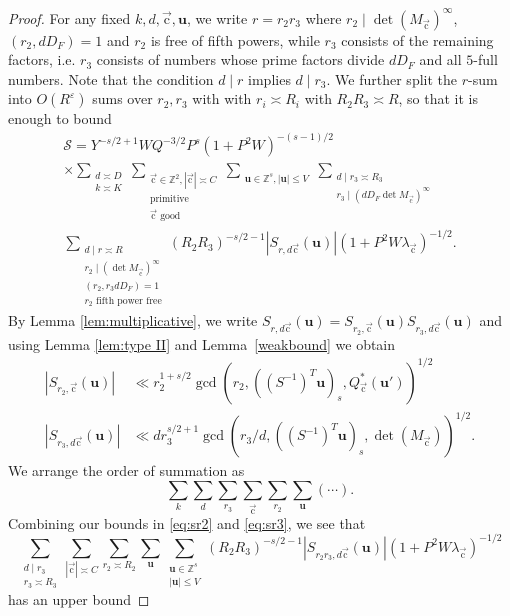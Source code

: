 \documentclass[letterpaper,11pt]{amsart}
\numberwithin{equation}{section}
\theoremstyle{definition}
\numberwithin{equation}{section}
\newcommand{\Z}{\mathbb{Z}}
\newcommand{\ZZ}{\mathbb{Z}}
\newcommand{\uu}{\mathbf{u}}
\newcommand{\uc}{{\vec{\mathrm{c}}}}
\newcommand{\ve}{\varepsilon}
\begin{document}
\begin{proof}
For any fixed $k, d, \uc, \uu$, we write $r=r_2r_3$ where $r_2\mid \det(M_{\uc})^\infty$, $(r_2, dD_F)=1$ and $r_2$ is free of fifth powers, while $r_3$ consists of the remaining factors, i.e. $r_3$ consists of numbers whose prime factors divide $dD_F$ and all $5$-full numbers. Note that the condition $d\mid r$ implies $d\mid r_3$.
We further split the $r$-sum into $O(R^\ve)$ sums over $r_2,r_3$ with with $r_i\asymp R_i$ with $R_2R_3\asymp R$, so that it is enough to bound
\begin{multline*}%
\mathcal S=Y^{-s/2+1}WQ^{-3/2}P^{s}(1+P^2W)^{-(s-1)/2}\\
\times\sum_{\substack{d\asymp D\\ k\asymp K}}\sum_{\substack{\uc\in \ZZ^2, |\uc|\asymp C\\ \text{primitive}\\ \uc \text{ good} }}\sum_{\substack{\uu\in \ZZ^s, |\uu|\leq V}}\sum_{\substack{d\mid r_3\asymp R_3\\ r_3\mid (dD_F\det M_\uc)^\infty}}\\ \sum_{\substack{d\mid r\asymp R\\  r_2\mid (\det M_\uc)^\infty\\ (r_2, r_3dD_F)=1\\ r_2 \text{ fifth power free}}}(R_2R_3)^{-s/2-1}|S_{r, d\uc}(\uu)| (1+P^2W\lambda_\uc)^{-1/2}.
\end{multline*}
By Lemma \ref{lem:multiplicative}, we write
$S_{r,d\uc}(\uu)=S_{r_2,\uc}(\uu)S_{r_3,d\uc}(\uu)$ and using 
Lemma \ref{lem:type II} and Lemma~\ref{weakbound} we obtain
\begin{align}
|S_{r_2,\uc}(\uu)|&\ll r_2^{1+s/2}\gcd(r_2,((S^{-1})^T\uu)_s,Q^*_\uc(\uu'))^{1/2}\label{eq:sr2}\\
|S_{r_3,d\uc}(\uu)| &\ll dr_3^{s/2+1}\gcd(r_3/d,((S^{-1})^T\uu)_s,\det(M_\uc))^{1/2}\label{eq:sr3}.
\end{align}
 We arrange the order of summation as  
\begin{equation*}
\sum_{k}\sum_{d}\sum_{r_3}\sum_{\text{$\uc$}}\sum_{r_2}\sum_{\uu}(\cdots).\end{equation*}
Combining our bounds in \eqref{eq:sr2} and \eqref{eq:sr3}, we see that 
$$
\sum_{\substack{d\mid r_3\\ r_3\asymp R_3}}\sum_{|\uc|\asymp C}\sum_{r_2\asymp R_2}\sum_{\uu}\sum_{\substack{\uu\in \Z^s\\|\uu|\leq V }}(R_2R_3)^{-s/2-1}|S_{r_2r_3,d\uc}(\uu)|(1+P^2W\lambda_\uc)^{-1/2}
$$
has an upper bound

\end{proof}
\end{document}

